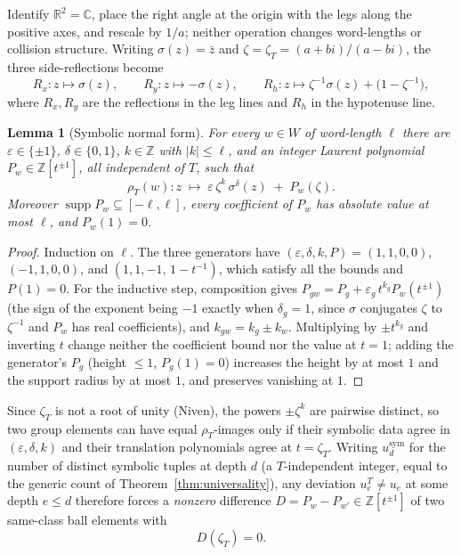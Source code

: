 \documentclass[11pt,a4paper]{article}
\newtheorem{lemma}[theorem]{Lemma}
\theoremstyle{remark}
\theoremstyle{plain}
\begin{document}
Identify $\mathbb{R}^2 = \mathbb{C}$, place the right angle at the
origin with the legs along the positive axes, and rescale by $1/a$;
neither operation changes word-lengths or collision structure.  Writing
$\sigma(z) = \bar z$ and $\zeta = \zeta_T = (a+bi)/(a-bi)$, the three
side-reflections become
\[
R_x : z \mapsto \sigma(z), \qquad
R_y : z \mapsto -\sigma(z), \qquad
R_h : z \mapsto \zeta^{-1}\sigma(z) + \bigl(1 - \zeta^{-1}\bigr),
\]
where $R_x, R_y$ are the reflections in the leg lines and $R_h$ in the
hypotenuse line.

\begin{lemma}[Symbolic normal form]
\label{lem:symbolic-form}
For every $w \in W$ of word-length $\ell$ there are
$\varepsilon \in \{\pm 1\}$, $\delta \in \{0,1\}$,
$k \in \mathbb{Z}$ with $|k| \le \ell$, and an integer Laurent
polynomial $P_w \in \mathbb{Z}[t^{\pm 1}]$, \emph{all independent of
$T$}, such that
\[
\rho_T(w)\colon z \;\longmapsto\;
\varepsilon\, \zeta^{k}\, \sigma^{\delta}(z) \;+\; P_w(\zeta).
\]
Moreover $\operatorname{supp} P_w \subseteq [-\ell, \ell]$, every
coefficient of $P_w$ has absolute value at most $\ell$, and
$P_w(1) = 0$.
\end{lemma}

\begin{proof}
Induction on $\ell$.  The three generators have
$(\varepsilon, \delta, k, P) = (1,1,0,0)$, $(-1,1,0,0)$, and
$(1,1,-1,\, 1 - t^{-1})$, which satisfy all the bounds and $P(1)=0$.
For the inductive step, composition gives
$P_{gw} = P_g + \varepsilon_g\, t^{k_g} P_w(t^{\pm 1})$ (the sign of the
exponent being $-1$ exactly when $\delta_g = 1$, since
$\sigma$ conjugates $\zeta$ to $\zeta^{-1}$ and $P_w$ has real
coefficients), and $k_{gw} = k_g \pm k_w$.  Multiplying by
$\pm t^{k_g}$ and inverting $t$ change neither the coefficient bound nor
the value at $t = 1$; adding the generator's $P_g$ (height $\le 1$,
$P_g(1) = 0$) increases the height by at most $1$ and the support radius
by at most $1$, and preserves vanishing at $1$.
\end{proof}

Since $\zeta_T$ is not a root of unity (Niven), the powers
$\pm\zeta^k$ are pairwise distinct, so two group elements can have equal
$\rho_T$-images only if their symbolic data agree in
$(\varepsilon, \delta, k)$ and their translation polynomials agree at
$t = \zeta_T$.  Writing $u_d^{\mathrm{sym}}$ for the number of distinct
symbolic tuples at depth $d$ (a $T$-independent integer, equal to the
generic count of Theorem~\ref{thm:universality}), any deviation
$u_e^T \ne u_e$ at some depth $e \le d$ therefore forces a \emph{nonzero}
difference $D = P_w - P_{w'} \in \mathbb{Z}[t^{\pm 1}]$ of two
same-class ball elements with
\begin{equation}
\label{eq:collision-vanishing}
D(\zeta_T) = 0 .
\end{equation}
\end{document}
